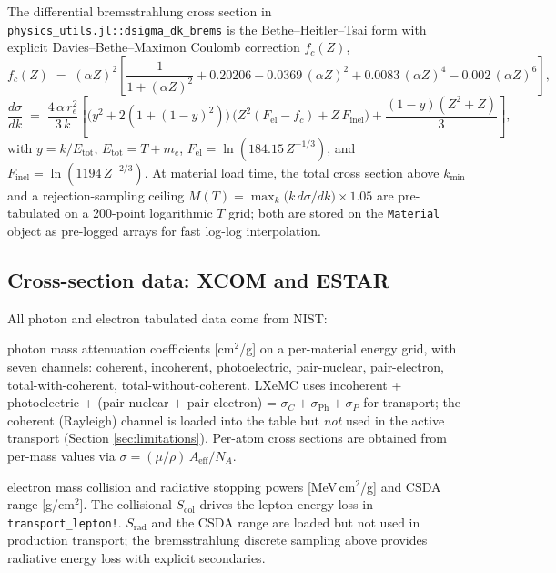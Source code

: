 \documentclass[11pt]{article}
\begin{document}
The differential bremsstrahlung cross section in
\texttt{physics\_utils.jl::dsigma\_dk\_brems} is the Bethe--Heitler--Tsai
form with explicit Davies--Bethe--Maximon Coulomb correction $f_c(Z)$,
\begin{equation*}
f_c(Z) \;=\; (\alpha Z)^2 \!\left[\frac{1}{1 + (\alpha Z)^2} + 0.20206
- 0.0369\,(\alpha Z)^2 + 0.0083\,(\alpha Z)^4 - 0.002\,(\alpha Z)^6\right],
\end{equation*}
\begin{equation*}
\frac{d\sigma}{dk} \;=\; \frac{4\,\alpha\,r_e^2}{3\,k} \!\left[
\bigl(y^2 + 2(1 + (1 - y)^2)\bigr)\,\bigl(Z^2 (F_{\mathrm{el}} - f_c) + Z\,F_{\mathrm{inel}}\bigr)
+ \frac{(1 - y)(Z^2 + Z)}{3}\right],
\end{equation*}
with $y = k/E_{\mathrm{tot}}$, $E_{\mathrm{tot}} = T + m_e$,
$F_{\mathrm{el}} = \ln(184.15\,Z^{-1/3})$, and
$F_{\mathrm{inel}} = \ln(1194\,Z^{-2/3})$. At material load time, the total
cross section above $k_{\min}$ and a rejection-sampling ceiling $M(T) =
\max_{k}\bigl(k\,d\sigma/dk\bigr) \times 1.05$ are pre-tabulated on a
200-point logarithmic $T$ grid; both are stored on the \texttt{Material}
object as pre-logged arrays for fast log-log interpolation.

\subsection{Cross-section data: XCOM and ESTAR}
\label{sec:physics-tables}

All photon and electron tabulated data come from NIST:

\begin{description}[leftmargin=2.0cm,style=nextline]
\item[XCOM] photon mass attenuation coefficients [cm$^2$/g] on a per-material
energy grid, with seven channels: coherent, incoherent, photoelectric,
pair-nuclear, pair-electron, total-with-coherent, total-without-coherent.
LXeMC uses incoherent + photoelectric + (pair-nuclear $+$ pair-electron) =
$\sigma_C + \sigma_{\mathrm{Ph}} + \sigma_P$ for transport; the coherent
(Rayleigh) channel is loaded into the table but \emph{not} used in the active
transport (Section \ref{sec:limitations}). Per-atom cross sections are
obtained from per-mass values via $\sigma = (\mu/\rho)\,A_{\mathrm{eff}}/N_A$.

\item[ESTAR] electron mass collision and radiative stopping powers
[MeV\,cm$^2$/g] and CSDA range [g/cm$^2$]. The collisional $S_{\mathrm{col}}$
drives the lepton energy loss in \texttt{transport\_lepton!}.
$S_{\mathrm{rad}}$ and the CSDA range are loaded but not used in production
transport; the bremsstrahlung discrete sampling above provides radiative
energy loss with explicit secondaries.
\end{description}
\end{document}
